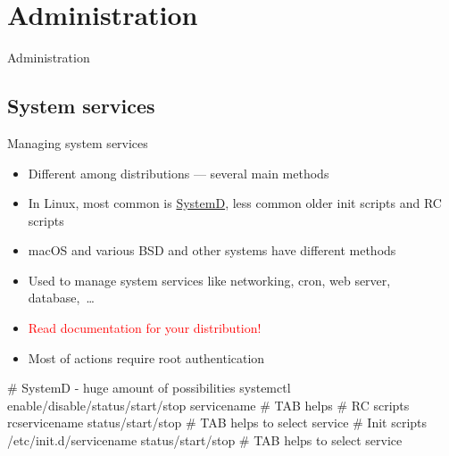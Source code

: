 \documentclass[compress, ucs, xelatex, 11pt, xcolor=svgnames,
  hyperref={
    bookmarks=true,
    unicode=true,
    colorlinks=true,
    pdftitle={Linux, command line and MetaCentrum},
    plainpages=false,
    pdfauthor={Vojtech Zeisek},
    pdfsubject={Course about use of Linux command line, writing shell scripts and using MetaCentrum of CESNET},
    pdfcreator={XeLaTeX},
    pdfkeywords={Linux, GNU, BASH, shell, command line, MetaCentrum},
    linkcolor=DarkRed,
    anchorcolor=DarkBlue,
    citecolor=Indigo,
    filecolor=NavyBlue,
    menucolor=DarkMagenta,
    urlcolor=DarkBlue,
    pdftex},
  url={hyphens, lowtilde} %
  ]{beamer}
\renewcommand{\alert}[1]{\textcolor{red}{#1}}
\begin{document}
\section{Administration}

\begin{frame}{Administration}
  \tableofcontents[currentsection, sectionstyle=show/hide, hideothersubsections]
\end{frame}


\subsection{System services}

\begin{frame}[fragile]{Managing system services}
  \begin{itemize}
    \item Different among distributions --- several main methods
    \item In Linux, most common is \href{https://wiki.freedesktop.org/www/Software/systemd/}{SystemD}, less common older init scripts and RC scripts
    \item macOS and various BSD and other systems have different methods
    \item Used to manage system services like networking, cron, web server, database,~\ldots
    \item \alert{Read documentation for your distribution!}
    \item Most of actions require root authentication
  \end{itemize}
  \begin{bashcode}
    # SystemD - huge amount of possibilities
    systemctl enable/disable/status/start/stop servicename # TAB helps
    # RC scripts
    rcservicename status/start/stop # TAB helps to select service
    # Init scripts
    /etc/init.d/servicename status/start/stop # TAB helps to select service
  \end{bashcode}
\end{frame}
\end{document}
